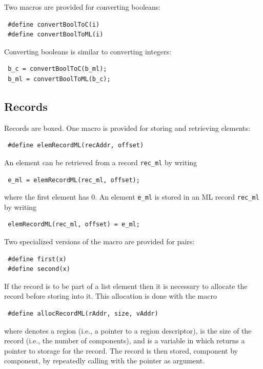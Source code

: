 \documentclass[12pt]{book}
\begin{document}
Two macros are provided for converting booleans:
%
%
\begin{verbatim}
 #define convertBoolToC(i)
 #define convertBoolToML(i)
\end{verbatim}
Converting booleans is similar to converting integers:
\begin{verbatim}
 b_c = convertBoolToC(b_ml);
 b_ml = convertBoolToML(b_c);
\end{verbatim}

\subsection{Records}
Records are boxed. One macro is provided for storing and retrieving
elements:
%
\begin{verbatim}
 #define elemRecordML(recAddr, offset)
\end{verbatim}
An element can be retrieved from a record \verb|rec_ml| by writing 
\begin{verbatim}
 e_ml = elemRecordML(rec_ml, offset);
\end{verbatim}
where the first element has  0. An element \verb|e_ml|
is stored in an ML record \verb|rec_ml| by writing
\begin{verbatim}
 elemRecordML(rec_ml, offset) = e_ml;
\end{verbatim}
Two specialized versions of the  macro are
provided for 
%
%
pairs:
\begin{verbatim}
 #define first(x)
 #define second(x)
\end{verbatim}

If the record is to be part of a list element then it is necessary to allocate the record
before storing into it. This allocation is done with the macro
%
\begin{verbatim}
 #define allocRecordML(rAddr, size, vAddr)
\end{verbatim}
where  denotes a region (i.e., a pointer to a region
descriptor),  is the size of the record (i.e., the number
of components), and  is a variable in which
 returns a pointer to storage for the record. The
record is then stored, component by component, by repeatedly calling
 with the pointer  as argument.
\end{document}
